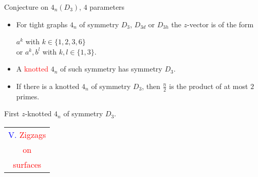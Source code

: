 \documentclass[%
pdf,
colorBG,
slideColor,
]{prosper}
\begin{document}
\begin{slide}{Conjecture on $4_n(D_3)$, $4$ parameters}
\vspace{-3mm}
\begin{itemize}
\item For tight graphs $4_n$ of symmetry $D_3$, $D_{3d}$ or $D_{3h}$ the $z$-vector is of the form
\begin{center}
$a^k$ with $k\in \{1, 2, 3, 6\}$\\
or $a^k, b^l$ with $k,l\in \{1, 3\}$.
\end{center}

\item A \textcolor{red}{knotted} $4_n$ of such symmetry has symmetry $D_3$.

\item If there is a knotted $4_n$ of symmetry $D_3$, then $\frac{n}{2}$ is the product of at most $2$ primes.

\end{itemize}



\begin{center}
\begin{minipage}{5cm}
\par
\end{minipage}
\begin{minipage}{5cm}
First $z$-knotted $4_n$ of symmetry $D_3$.
\end{minipage}
\end{center}

\end{slide}









\begin{slide}{}
\begin{center}
{\Huge 
\begin{tabular*}{6cm}{c}
\\[-0.5cm]
\textcolor{blue}{V. }\textcolor{red}{Zigzags}\\
\textcolor{red}{on}\\
\textcolor{red}{surfaces}
\end{tabular*}
}
\end{center}
\end{slide}
\end{document}
